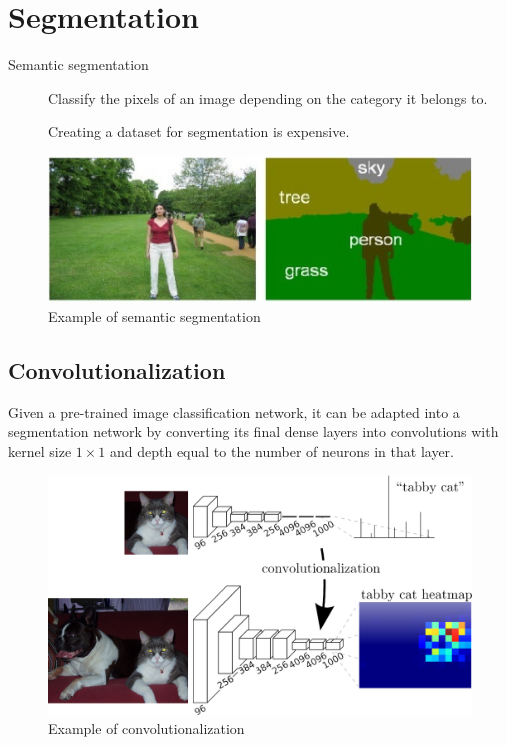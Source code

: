 \section{Segmentation}

\begin{description}
    \item[Semantic segmentation] 
        Classify the pixels of an image depending on the category it belongs to.

        \begin{remark}
            Creating a dataset for segmentation is expensive.
        \end{remark}
\end{description}

\begin{figure}[H]
    \centering
    \includegraphics[width=0.75\linewidth]{./img/semantic_segmentation.png}
    \caption{Example of semantic segmentation}
\end{figure}


\subsection{Convolutionalization}

Given a pre-trained image classification network,
it can be adapted into a segmentation network by converting its final dense layers into convolutions
with kernel size $1 \times 1$ and depth equal to the number of neurons in that layer.

\begin{figure}[H]
    \centering
    \includegraphics[width=0.5\linewidth]{./img/_convolutionalization.pdf}
    \caption{Example of convolutionalization}
\end{figure}

